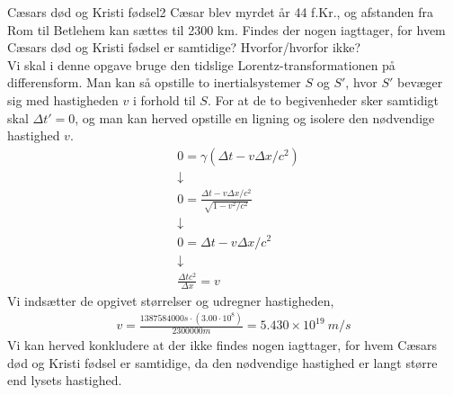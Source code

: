 \begin{opgave}{Cæsars død og Kristi fødsel}{2}
	Cæsar blev myrdet år 44 f.Kr., og afstanden fra Rom til Betlehem kan sættes til 2300 km.
	\opg Findes der nogen iagttager, for hvem Cæsars død og Kristi fødsel er samtidige? Hvorfor/hvorfor ikke?\\
	
	Vi skal i denne opgave bruge den tidslige Lorentz-transformationen på differensform. Man kan så opstille to inertialsystemer $S$ og $S'$, hvor $S'$ bevæger sig med hastigheden $v$ i forhold til $S$. For at de to begivenheder sker samtidigt skal $\Delta t'=0$, og man kan herved opstille en ligning og isolere den nødvendige hastighed $v$.
	\begin{align*}
		&0=\gamma(\Delta t-v\Delta x/c^2) \\
		&\downarrow \\
		&0=\frac{\Delta t-v\Delta x/c^2}{\sqrt{1-v^2/c^2}} \\
		&\downarrow \\
		&0=\Delta t-v\Delta x/c^2 \\
		&\downarrow \\
		&\frac{\Delta tc^2}{\Delta x}=v
	\end{align*}
	Vi indsætter de opgivet størrelser og udregner hastigheden,
	\begin{align*}
		v=\frac{1387584000 s \cdot (3.00\cdot 10^8)}{2300000 m}=5.430 \times 10^{19}  \ \si{m/s}
	\end{align*}
	Vi kan herved konkludere at der ikke findes nogen iagttager, for hvem Cæsars død og Kristi fødsel er samtidige, da den nødvendige hastighed er langt større end lysets hastighed.
\end{opgave}

